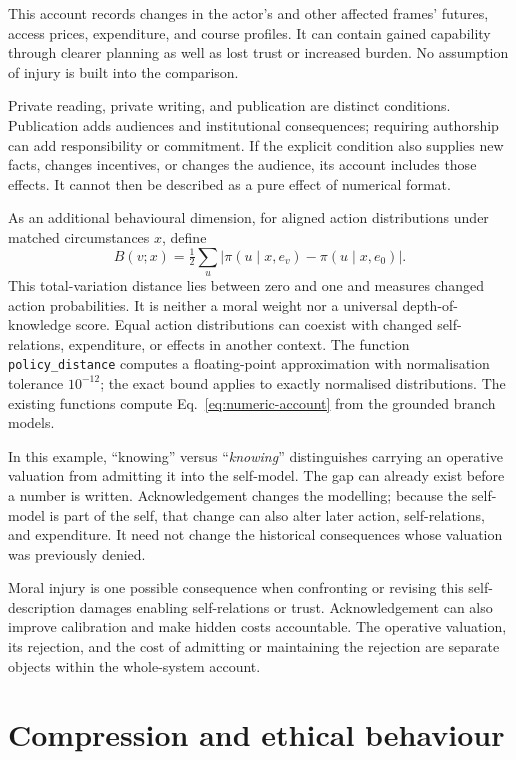 \documentclass[11pt,a4paper]{article}
\theoremstyle{remark}
\begin{document}
This account records changes in the actor's and other affected frames' futures,
access prices, expenditure, and course profiles. It can contain gained capability
through clearer planning as well as lost trust or increased burden. No assumption
of injury is built into the comparison.

Private reading, private writing, and publication are distinct conditions.
Publication adds audiences and institutional consequences; requiring authorship
can add responsibility or commitment. If the explicit condition also supplies
new facts, changes incentives, or changes the audience, its account includes
those effects. It cannot then be described as a pure effect of numerical format.

As an additional behavioural dimension, for aligned action distributions under
matched circumstances $x$, define
\begin{equation}\label{eq:policy-distance}
B(v;x)=\tfrac12\sum_u|\pi(u\mid x,e_v)-\pi(u\mid x,e_0)|.
\end{equation}
This total-variation distance lies between zero and one and measures changed
action probabilities. It is neither a moral weight nor a universal depth-of-knowledge
score. Equal action distributions can coexist with changed self-relations,
expenditure, or effects in another context. The function \texttt{policy\_distance}
computes a floating-point approximation with normalisation tolerance
$10^{-12}$; the exact bound applies to exactly normalised distributions.
The existing functions compute
Eq.~\eqref{eq:numeric-account} from the grounded branch models.

In this example, ``knowing'' versus ``\emph{knowing}'' distinguishes carrying an
operative valuation from admitting it into the self-model. The gap can already
exist before a number is written. Acknowledgement changes the modelling; because
the self-model is part of the self, that change can also alter later action,
self-relations, and expenditure. It need not change the historical consequences
whose valuation was previously denied.

Moral injury is one possible consequence when confronting or revising this
self-description damages enabling self-relations or trust. Acknowledgement can
also improve calibration and make hidden costs accountable. The operative
valuation, its rejection, and the cost of admitting or maintaining the rejection
are separate objects within the whole-system account.

\section{Compression and ethical behaviour}\label{sec:compression}
\end{document}
